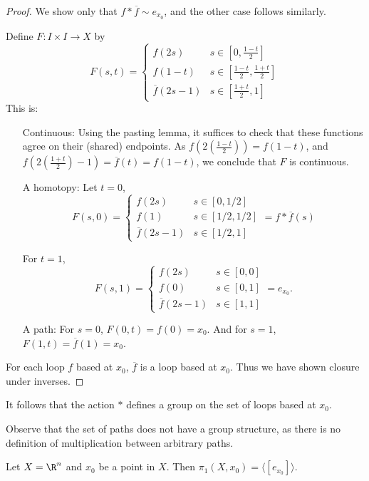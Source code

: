 \begin{proof}
 We show only that $f*\overline{f}\sim e_{x_0}$, and the other case follows similarly.

Define $F:I\times I\to X$ by 
\[
F(s,t)=\begin{cases} 
		f(2s) & s\in \left[0,\tfrac{1-t}{2}\right] \\ 
		f(1-t) & s\in \left[\tfrac{1-t}{2},\tfrac{1+t}{2}\right]\\ 
		\overline{f}(2s-1) & s\in\left[\tfrac{1+t}{2}, 1\right]
	  \end{cases}
\]
This is:
\begin{itemize}
\item[Continuous:] Using the pasting lemma, it suffices to check that these functions agree on their (shared) endpoints.  As $f(2(\tfrac{1-t}{2}))=f(1-t)$, and $f(2(\tfrac{1+t}{2})-1)=\overline{f}(t)=f(1-t)$, we conclude that $F$ is continuous.

\item[A homotopy:] Let $t=0$, 
\[F(s,0)=\begin{cases} 
		f(2s) & s\in [0,1/2]\\ 
		f(1) & s\in [1/2,1/2] \\ 
		\overline{f}(2s-1) & s\in [1/2,1]
\end{cases}=f*\overline{f}(s)\]

For $t=1$, 
\[F(s,1)=\begin{cases} 
		f(2s) & s\in [0,0]\\ 
		f(0) & s\in [0,1]\\ 
		\overline{f}(2s-1) & s\in [1,1]
	\end{cases} =e_{x_0}.\]

\item[A path:] For $s=0$, $F(0,t)=f(0)=x_0$.  And for $s=1$, $F(1,t)=\overline{f}(1)=x_0$.
\end{itemize}

For each loop $f$ based at $x_0$, $\overline{f}$ is a loop based at $x_0$.  Thus we have shown closure under inverses.
\end{proof}

It follows that the action $*$ defines a group on the set of loops based at $x_0$.

Observe that the set of paths does not have a group structure, as there is no definition of multiplication between arbitrary paths.

\begin{example} 
Let $X=\R^n$ and $x_0$ be a point in $X$. Then $\pi_1(X,x_0)=\langle [e_{x_0}]\rangle$.
\end{example}

